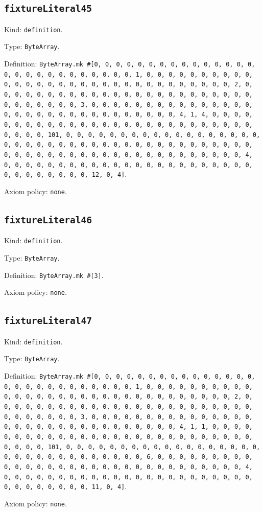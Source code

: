 \documentclass[11pt]{article}
\begin{document}
\subsection*{\texttt{fixtureLiteral45}}
\noindent Kind: \texttt{definition}.\par
\noindent Type: \texttt{ByteArray}.\par
\noindent Definition: \texttt{ByteArray.mk \#[0, 0, 0, 0, 0, 0, 0, 0, 0, 0, 0, 0, 0, 0, 0, 0, 0, 0, 0, 0, 0, 0, 0, 0, 0, 0, 0, 1, 0, 0, 0, 0, 0, 0, 0, 0, 0, 0, 0, 0, 0, 0, 0, 0, 0, 0, 0, 0, 0, 0, 0, 0, 0, 0, 0, 0, 0, 0, 0, 2, 0, 0, 0, 0, 0, 0, 0, 0, 0, 0, 0, 0, 0, 0, 0, 0, 0, 0, 0, 0, 0, 0, 0, 0, 0, 0, 0, 0, 0, 0, 0, 3, 0, 0, 0, 0, 0, 0, 0, 0, 0, 0, 0, 0, 0, 0, 0, 0, 0, 0, 0, 0, 0, 0, 0, 0, 0, 0, 0, 0, 0, 0, 0, 4, 1, 4, 0, 0, 0, 0, 0, 0, 0, 0, 0, 0, 0, 0, 0, 0, 0, 0, 0, 0, 0, 0, 0, 0, 0, 0, 0, 0, 0, 0, 0, 0, 0, 101, 0, 0, 0, 0, 0, 0, 0, 0, 0, 0, 0, 0, 0, 0, 0, 0, 0, 0, 0, 0, 0, 0, 0, 0, 0, 0, 0, 0, 0, 0, 0, 0, 0, 0, 0, 0, 0, 0, 0, 0, 0, 0, 0, 0, 0, 0, 0, 0, 0, 0, 0, 0, 0, 0, 0, 0, 0, 0, 0, 0, 0, 0, 0, 4, 0, 0, 0, 0, 0, 0, 0, 0, 0, 0, 0, 0, 0, 0, 0, 0, 0, 0, 0, 0, 0, 0, 0, 0, 0, 0, 0, 0, 0, 0, 0, 12, 0, 4]}.\par
\noindent Axiom policy: \texttt{none}.\par
\subsection*{\texttt{fixtureLiteral46}}
\noindent Kind: \texttt{definition}.\par
\noindent Type: \texttt{ByteArray}.\par
\noindent Definition: \texttt{ByteArray.mk \#[3]}.\par
\noindent Axiom policy: \texttt{none}.\par
\subsection*{\texttt{fixtureLiteral47}}
\noindent Kind: \texttt{definition}.\par
\noindent Type: \texttt{ByteArray}.\par
\noindent Definition: \texttt{ByteArray.mk \#[0, 0, 0, 0, 0, 0, 0, 0, 0, 0, 0, 0, 0, 0, 0, 0, 0, 0, 0, 0, 0, 0, 0, 0, 0, 0, 0, 1, 0, 0, 0, 0, 0, 0, 0, 0, 0, 0, 0, 0, 0, 0, 0, 0, 0, 0, 0, 0, 0, 0, 0, 0, 0, 0, 0, 0, 0, 0, 0, 2, 0, 0, 0, 0, 0, 0, 0, 0, 0, 0, 0, 0, 0, 0, 0, 0, 0, 0, 0, 0, 0, 0, 0, 0, 0, 0, 0, 0, 0, 0, 0, 3, 0, 0, 0, 0, 0, 0, 0, 0, 0, 0, 0, 0, 0, 0, 0, 0, 0, 0, 0, 0, 0, 0, 0, 0, 0, 0, 0, 0, 0, 0, 0, 4, 1, 1, 0, 0, 0, 0, 0, 0, 0, 0, 0, 0, 0, 0, 0, 0, 0, 0, 0, 0, 0, 0, 0, 0, 0, 0, 0, 0, 0, 0, 0, 0, 0, 101, 0, 0, 0, 0, 0, 0, 0, 0, 0, 0, 0, 0, 0, 0, 0, 0, 0, 0, 0, 0, 0, 0, 0, 0, 0, 0, 0, 0, 0, 0, 0, 6, 0, 0, 0, 0, 0, 0, 0, 0, 0, 0, 0, 0, 0, 0, 0, 0, 0, 0, 0, 0, 0, 0, 0, 0, 0, 0, 0, 0, 0, 0, 0, 4, 0, 0, 0, 0, 0, 0, 0, 0, 0, 0, 0, 0, 0, 0, 0, 0, 0, 0, 0, 0, 0, 0, 0, 0, 0, 0, 0, 0, 0, 0, 0, 11, 0, 4]}.\par
\noindent Axiom policy: \texttt{none}.\par
\end{document}
